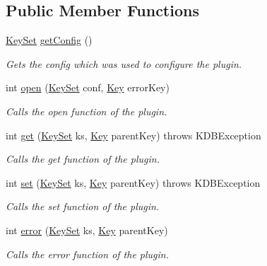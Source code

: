 \subsection*{Public Member Functions}
\begin{DoxyCompactItemize}
\item 
\hyperlink{classorg_1_1libelektra_1_1KeySet}{Key\+Set} \hyperlink{interfaceorg_1_1libelektra_1_1Plugin_a95ee37a782d5bd32fd95478788652d44}{get\+Config} ()
\begin{DoxyCompactList}\small\item\em Gets the config which was used to configure the plugin. \end{DoxyCompactList}\item 
int \hyperlink{interfaceorg_1_1libelektra_1_1Plugin_a740f0602ea62e7a28c86fc801add8907}{open} (\hyperlink{classorg_1_1libelektra_1_1KeySet}{Key\+Set} conf, \hyperlink{classorg_1_1libelektra_1_1Key}{Key} error\+Key)
\begin{DoxyCompactList}\small\item\em Calls the open function of the plugin. \end{DoxyCompactList}\item 
int \hyperlink{interfaceorg_1_1libelektra_1_1Plugin_a9b8362549b7ab8ca5eff39cf6b7c8046}{get} (\hyperlink{classorg_1_1libelektra_1_1KeySet}{Key\+Set} ks, \hyperlink{classorg_1_1libelektra_1_1Key}{Key} parent\+Key)  throws K\+D\+B\+Exception
\begin{DoxyCompactList}\small\item\em Calls the get function of the plugin. \end{DoxyCompactList}\item 
int \hyperlink{interfaceorg_1_1libelektra_1_1Plugin_a650ce789086f5becf21c5f91fad4c42e}{set} (\hyperlink{classorg_1_1libelektra_1_1KeySet}{Key\+Set} ks, \hyperlink{classorg_1_1libelektra_1_1Key}{Key} parent\+Key)  throws K\+D\+B\+Exception
\begin{DoxyCompactList}\small\item\em Calls the set function of the plugin. \end{DoxyCompactList}\item 
int \hyperlink{interfaceorg_1_1libelektra_1_1Plugin_aa91370570c862ebe9eb83094a4731b9a}{error} (\hyperlink{classorg_1_1libelektra_1_1KeySet}{Key\+Set} ks, \hyperlink{classorg_1_1libelektra_1_1Key}{Key} parent\+Key)
\begin{DoxyCompactList}\small\item\em Calls the error function of the plugin. \end{DoxyCompactList}\item 

\end{DoxyCompactItemize}

